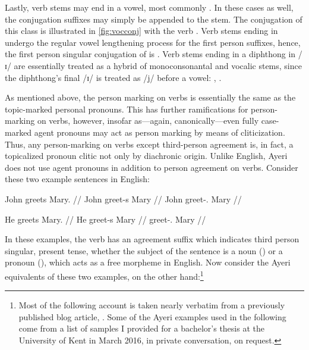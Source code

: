 Lastly, verb stems may end in a vowel, most commonly . In these cases as
well, the conjugation suffixes may simply be appended to the stem. The
conjugation of this class is illustrated in \autoref{fig:vocconj} with the verb
. Verb stems ending in  undergo the regular vowel
lengthening process for the first person suffixes, hence, the first person
singular conjugation of  is .
Verb stems ending in a diphthong in /ɪ/ are essentially treated as a hybrid of
monoconsonantal and vocalic stems, since the diphthong's final /ɪ/ is treated
as /j/ before a vowel: ,
.

As mentioned above, the person marking on verbs is essentially the same as the
topic-marked personal pronouns. This has further ramifications for person-
marking on verbs, however, insofar as---again, canonically---even fully case-
marked agent pronouns may act as person marking by means of cliticization.
Thus, any person-marking on verbs except third-person agreement is, in fact, a
topicalized pronoun clitic not only by diachronic origin. Unlike English, Ayeri
does not use agent pronouns in addition to person agreement on verbs. Consider
these two example sentences in English:

\pex
\a\label{ex:vbagrengnn}\begingl{}%
	\gla John greets Mary. //
	\glb John greet-s Mary //
	\glc John greet-\Tsg{}.\Prs{} Mary //
\endgl

\a\label{ex:vbagrengpr}\begingl
	\gla He greets Mary. //
	\glb He greet-s Mary //
	\glc \TsgM{} greet-\Tsg{}.\Prs{} Mary //
\endgl

\xe

In these examples, the verb has an agreement suffix  which indicates
third person singular, present tense, whether the subject of the sentence is a
noun () or a pronoun (), which acts as a free morpheme in
English. Now consider the Ayeri equivalents of these two examples, on the other
hand:\footnote{Most of the following account is taken nearly verbatim from a
previously published blog article, \citet{benung:verbagreement}. Some of the
Ayeri examples used in the following come from a list of samples I provided for
a bachelor's thesis at the University of Kent in March 2016, in private
conversation, on request.%
}

